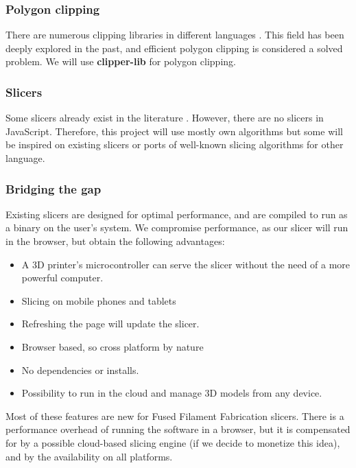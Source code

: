 \subsubsection{Polygon clipping}
There are numerous clipping libraries in different languages \cite{gh:clipper-lib, gh:clipper, gh:lineclip}. This field has been deeply explored in the past, and efficient polygon clipping is considered a solved problem. We will use \textbf{clipper-lib} for polygon clipping.

\subsubsection{Slicers}
Some slicers already exist in the literature \cite{gh:curaengine, gh:slic3r}. However, there are no slicers in JavaScript. Therefore, this project will use mostly own algorithms but some will be inspired on existing slicers or ports of well-known slicing algorithms for other language.

\subsubsection{Bridging the gap}
Existing slicers are designed for optimal performance, and are compiled to run as a binary on the user's system. We compromise performance, as our slicer will run in the browser, but obtain the following advantages:

\begin{itemize}
    \item A 3D printer's microcontroller can serve the slicer without the need of a more powerful computer.
    \item Slicing on mobile phones and tablets
    \item Refreshing the page will update the slicer.
    \item Browser based, so cross platform by nature
    \item No dependencies or installs.
    \item Possibility to run in the cloud and manage 3D models from any device.
\end{itemize}

Most of these features are new for Fused Filament Fabrication slicers. There is a performance overhead of running the software in a browser, but it is compensated for by a possible cloud-based slicing engine (if we decide to monetize this idea), and by the availability on all platforms.






